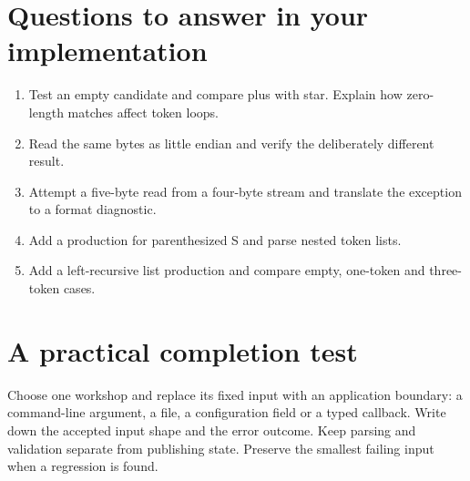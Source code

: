 \section*{Questions to answer in your implementation}
\begin{enumerate}
\item Test an empty candidate and compare plus with star. Explain how zero-length matches affect token loops.
\item Read the same bytes as little endian and verify the deliberately different result.
\item Attempt a five-byte read from a four-byte stream and translate the exception to a format diagnostic.
\item Add a production for parenthesized S and parse nested token lists.
\item Add a left-recursive list production and compare empty, one-token and three-token cases.
\end{enumerate}
\section*{A practical completion test}
Choose one workshop and replace its fixed input with an application boundary: a command-line argument, a file, a configuration field or a typed callback. Write down the accepted input shape and the error outcome. Keep parsing and validation separate from publishing state. Preserve the smallest failing input when a regression is found.

